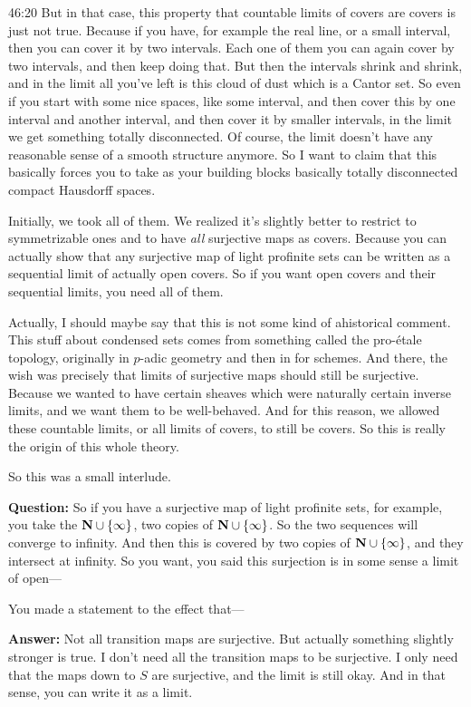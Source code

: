 \begin{unfinished}{46:20}
But in that case, this property that countable limits of covers are covers is just not true. Because if you have, for example the real line, or a small interval, then you can cover it by two intervals. Each one of them you can again cover by two intervals, and then keep doing that. But then the intervals shrink and shrink, and in the limit all you've left is this cloud of dust which is a Cantor set. So even if you start with some nice spaces, like some interval, and then cover this by one interval and another interval, and then cover it by smaller intervals, in the limit we get something totally disconnected.
Of course, the limit doesn't have any reasonable sense of a smooth structure anymore. So I want to claim that this basically forces you to take as your building blocks basically totally disconnected compact Hausdorff spaces. 

Initially, we took all of them. We realized it's slightly better to restrict to symmetrizable ones and to have \emph{all} surjective maps as covers. Because you can actually show that any surjective map of light profinite sets can be written as a sequential limit of actually open covers. So if you want open covers and their sequential limits, you need all of them.

Actually, I should maybe say that this is not some kind of ahistorical comment. This stuff about condensed sets comes from something called the pro-étale topology, originally in $p$-adic geometry and then in for schemes. 
And there, the wish was precisely that limits of surjective maps should still be surjective. Because we wanted to have certain sheaves which were naturally certain inverse limits, and we want them to be well-behaved. And for this reason, we allowed these countable limits, or all limits of covers, to still be covers. So this is really the origin of this whole theory.

So this was a small interlude. 

\textbf{Question:} So if you have a surjective map of light profinite sets, for example, you take the $\mathbf N \cup \{\infty\}$, two copies of $\mathbf N \cup \{\infty\}$. So the two sequences will converge to infinity. And then this is covered by two copies of $\mathbf N \cup \{\infty\}$, and they intersect at infinity. So you want, you said this surjection is in some sense a limit of open---

You made a statement to the effect that--- 

\textbf{Answer:} Not all transition maps are surjective. But actually something slightly stronger is true. I don't need all the transition maps to be surjective. I only need that the maps down to $S$ are surjective, and the limit is still okay. And in that sense, you can write it as a limit.


\end{unfinished}

